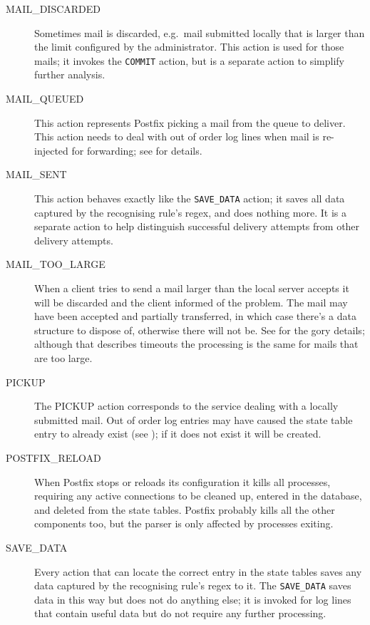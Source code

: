 \begin{description}
    \item [MAIL\_DISCARDED] Sometimes mail is discarded, e.g.\ mail
        submitted locally that is larger than the limit configured by the
        administrator.  This action is used for those mails; it invokes the
        \texttt{COMMIT} action, but is a separate action to simplify
        further analysis.

    \item [MAIL\_QUEUED] This action represents Postfix picking a mail from
        the queue to deliver.  This action needs to deal with out of order
        log lines when mail is re-injected for forwarding; see
         for details.

    \item [MAIL\_SENT] This action behaves exactly like the
        \texttt{SAVE\_DATA} action; it saves all data captured by the
        recognising rule's regex, and does nothing more.  It is a separate
        action to help distinguish successful delivery attempts from other
        delivery attempts.

    \item [MAIL\_TOO\_LARGE] When a client tries to send a mail larger than
        the local server accepts it will be discarded and the client
        informed of the problem.  The mail may have been accepted and
        partially transferred, in which case there's a data structure to
        dispose of, otherwise there will not be.  See  for the gory details; although that describes
        timeouts the processing is the same for mails that are too large.

    \item [PICKUP] The PICKUP action corresponds to the 
        service dealing with a locally submitted mail.  Out of order log
        entries may have caused the state table entry to already exist (see
        ); if it does not exist it
        will be created.

    \item [POSTFIX\_RELOAD] When Postfix stops or reloads its configuration
        it kills all  processes, requiring any active
        connections to be cleaned up, entered in the database, and deleted
        from the state tables.  Postfix probably kills all the other
        components too, but the parser is only affected by 
        processes exiting.

    \item [SAVE\_DATA] Every action that can locate the correct entry in
        the state tables saves any data captured by the recognising rule's
        regex to it.  The \texttt{SAVE\_DATA} saves data in this way but
        does not do anything else; it is invoked for log lines that contain
        useful data but do not require any further processing.


\end{description}
